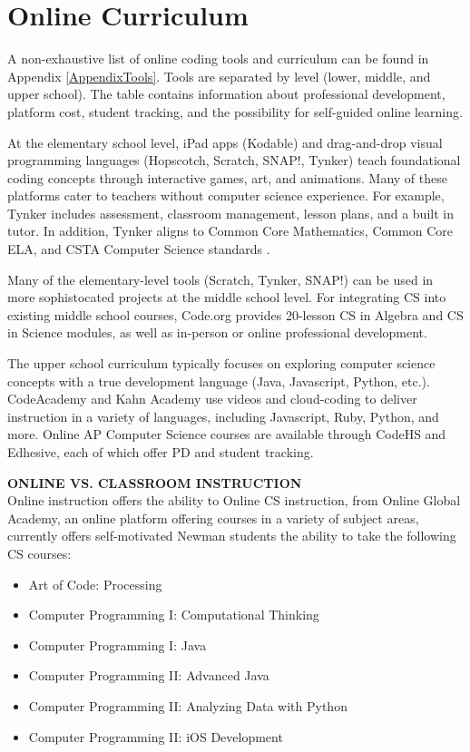 \section{Online Curriculum}
A non-exhaustive list of online coding tools and curriculum can be found in Appendix \ref{AppendixTools}. Tools are separated by level (lower, middle, and upper school). The table contains information about professional development, platform cost, student tracking, and the possibility for self-guided online learning. \par 
At the elementary school level, iPad apps (Kodable) and drag-and-drop visual programming languages (Hopscotch, Scratch, SNAP!, Tynker) teach foundational coding concepts through interactive games, art, and animations. Many of these platforms cater to teachers without computer science experience. For example, Tynker includes assessment, classroom management, lesson plans, and a built in tutor. In addition, Tynker aligns to Common Core Mathematics, Common Core ELA, and CSTA Computer Science standards \cite{tynker}. \par
Many of the elementary-level tools (Scratch, Tynker, SNAP!) can be used in more sophistocated projects at the middle school level. For integrating CS into existing middle school courses, Code.org provides 20-lesson CS in Algebra and CS in Science modules, as well as in-person or online professional development. \par
The upper school curriculum typically focuses on exploring computer science concepts with a true development language (Java, Javascript, Python, etc.). CodeAcademy and Kahn Academy use videos and cloud-coding to deliver instruction in a variety of languages, including Javascript, Ruby, Python, and more. Online AP Computer Science courses are available through CodeHS and Edhesive, each of which offer PD and student tracking.  \par

\textbf{ONLINE VS. CLASSROOM INSTRUCTION} \\
Online instruction offers the ability to 
Online CS instruction, from 
Online Global Academy, an online platform offering courses in a variety of subject areas, currently offers self-motivated Newman students the ability to take the following CS courses:
\begin{itemize}
\item Art of Code: Processing
\item Computer Programming I: Computational Thinking
\item Computer Programming I: Java
\item Computer Programming II: Advanced Java
\item Computer Programming II: Analyzing Data with Python
\item Computer Programming II: iOS Development
\end{itemize}

